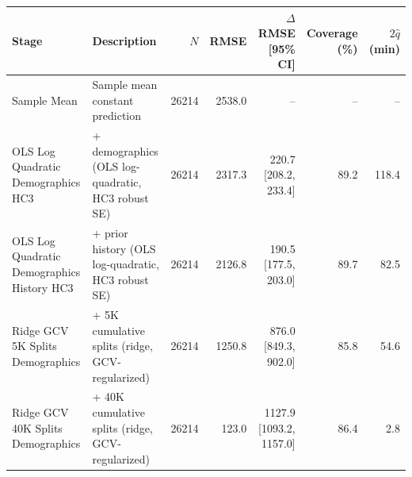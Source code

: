 \begin{tabular}{llrrrrr}
\hline
Stage & Description & $N$ & RMSE & $\Delta$RMSE [95\% CI] & Coverage (\%) & $2\hat{q}$ (min) \\
\hline
Sample Mean & Sample mean constant prediction & 26214 & 2538.0 & -- & -- & -- \\
OLS Log Quadratic Demographics HC3 & + demographics (OLS log-quadratic, HC3 robust SE) & 26214 & 2317.3 & 220.7 [208.2, 233.4] & 89.2 & 118.4 \\
OLS Log Quadratic Demographics History HC3 & + prior history (OLS log-quadratic, HC3 robust SE) & 26214 & 2126.8 & 190.5 [177.5, 203.0] & 89.7 & 82.5 \\
Ridge GCV 5K Splits Demographics & + 5K cumulative splits (ridge, GCV-regularized) & 26214 & 1250.8 & 876.0 [849.3, 902.0] & 85.8 & 54.6 \\
Ridge GCV 40K Splits Demographics & + 40K cumulative splits (ridge, GCV-regularized) & 26214 & 123.0 & 1127.9 [1093.2, 1157.0] & 86.4 & 2.8 \\
\hline
\end{tabular}
